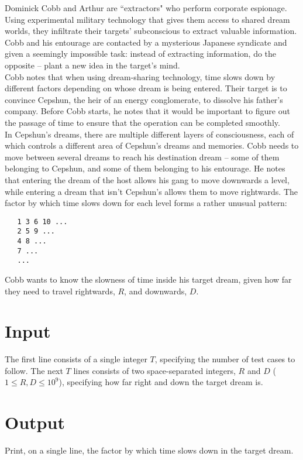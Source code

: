 
\noindent Dominick Cobb and Arthur are ``extractors" who perform corporate espionage. Using experimental military technology that gives them access to shared dream worlds, they infiltrate their targets' subconscious to extract valuable information. Cobb and his entourage are contacted by a mysterious Japanese syndicate and given a seemingly impossible task: instead of extracting information, do the opposite -- plant a new idea in the target's mind.\\

Cobb notes that when using dream-sharing technology, time slows down by different factors depending on whose dream is being entered. Their target is to convince Cepshun, the heir of an energy conglomerate, to dissolve his father's company. Before Cobb starts, he notes that it would be important to figure out the passage of time to ensure that the operation can be completed smoothly.\\

In Cepshun's dreams, there are multiple different layers of consciousness, each of which controls a different area of Cepshun's dreams and memories. Cobb needs to move between several dreams to reach his destination dream -- some of them belonging to Cepshun, and some of them belonging to his entourage. He notes that entering the dream of the host allows his gang to move downwards a level, while entering a dream that isn't Cepshun's allows them to move rightwards. The factor by which time slows down for each level forms a rather unusual pattern:

\begin{verbatim}
   1 3 6 10 ...
   2 5 9 ...
   4 8 ...
   7 ...
   ...
\end{verbatim}

\noindent Cobb wants to know the slowness of time inside his target dream, given how far they need to travel rightwards, $R$, and downwards, $D$.

\section*{Input}
The first line consists of a single integer $T$, specifying the number of test cases to follow.
The next $T$ lines consists of two space-separated integers, $R$ and $D$ ($1 \leq R, D \leq 10^{9}$), specifying how far right and down the target dream is.

\section*{Output}
Print, on a single line, the factor by which time slows down in the target dream.
